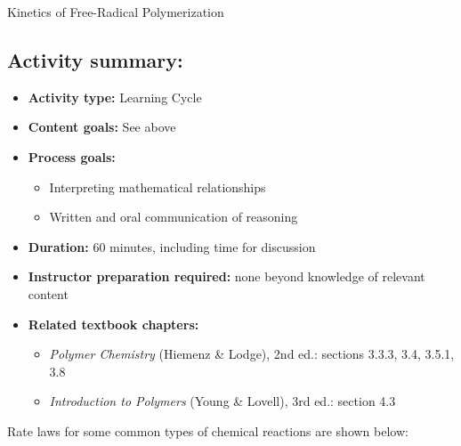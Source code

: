 \begin{activity}{Kinetics of Free-Radical Polymerization}
\begin{instructornotes}
	\subsection*{Activity summary:}
	\begin{itemize}
		\item \textbf{Activity type:} Learning Cycle
		\item \textbf{Content goals:} See above
		\item \textbf{Process goals:} %
			\begin{itemize}	
				\item Interpreting mathematical relationships
				\item Written and oral communication of reasoning
			\end{itemize}
		\item \textbf{Duration:} 60 minutes, including time for discussion
		\item \textbf{Instructor preparation required:} none beyond knowledge of relevant content
		\item \textbf{Related textbook chapters:}
			\begin{itemize}
				\item \emph{Polymer Chemistry} (Hiemenz \& Lodge), 2nd ed.: sections 3.3.3, 3.4, 3.5.1, 3.8
				\item \emph{Introduction to Polymers} (Young \& Lovell), 3rd ed.: section 4.3
			\end{itemize}
	\end{itemize}
	
\end{instructornotes}


\begin{model}
	\label{\labelbase:mdl:kineticeqns}

	Rate laws for some common types of chemical reactions are shown below:
	

\end{model}
\end{activity}
